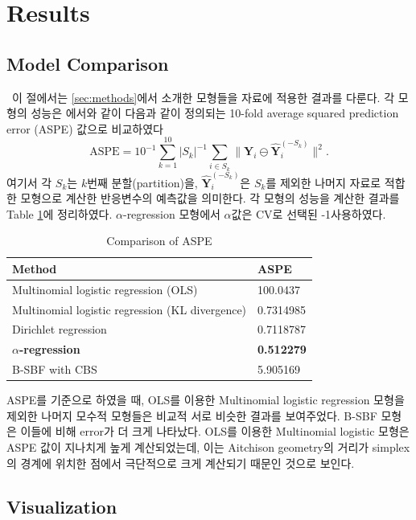 \section{Results}\label{sec:results}


\subsection{Model Comparison}\label{sec:comparison}


\ \quad 이 절에서는 \ref{sec:methods}에서 소개한 모형들을 자료에 적용한 결과를 다룬다. 각 모형의 성능은 \citet{jeon2018additive}에서와 같이 다음과 같이 정의되는 10-fold average squared prediction error (ASPE) 값으로 비교하였다
$$\text{ASPE} =  10^{-1}\sum_{k=1}^{10} |S_k|^{-1} \sum_{i \in S_k} \|\mathbf{Y}_i \ominus \hat{\mathbf{Y}}_i ^{(-S_k)} \|^2.$$
여기서 각 $S_k$는 $k$번째 분할(partition)을, $\hat{\mathbf{Y}}_i ^{(-S_k)}$은 $S_k$를 제외한 나머지 자료로 적합한 모형으로 계산한 반응변수의 예측값을 의미한다. 각 모형의 성능을 계산한 결과를 Table \ref{table:1}에 정리하였다. $\alpha$-regression 모형에서 $\alpha$값은 CV로 선택된 -1\를 사용하였다.

\begin{table}[!h]
	\centering
	\begin{tabular}{ @{}ll@{}  } 
		\toprule
		Method & ASPE \\
		\midrule
		Multinomial logistic regression (OLS) & 100.0437 \\
		Multinomial logistic regression (KL divergence) & 0.7314985 \\
		Dirichlet regression & 0.7118787 \\
		\textbf{$\alpha$-regression \citep{tsagris2015regression}} & \textbf{0.512279} \\ 
		B-SBF with CBS & 5.905169 \\ 
		\bottomrule
	\end{tabular}
	\caption{Comparison of ASPE}
	\label{table:1}
\end{table}

ASPE를 기준으로 하였을 때, OLS를 이용한 Multinomial logistic regression 모형을 제외한 나머지 모수적 모형들은 비교적 서로 비슷한 결과를 보여주었다. B-SBF 모형은 이들에 비해 error가 더 크게 나타났다. OLS를 이용한 Multinomial logistic 모형은 ASPE 값이 지나치게 높게 계산되었는데, 이는 Aitchison geometry의 거리가 simplex의 경계에 위치한 점에서 극단적으로 크게 계산되기 때문인 것으로 보인다.

\subsection{Visualization}\label{sec:visual}

